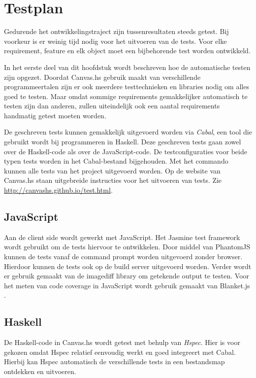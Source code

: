 \chapter{Testplan} \label{hoofdstuk:testplan}
Gedurende het ontwikkelingstraject zijn tussenresultaten steeds getest. Bij voorkeur is er weinig tijd nodig voor het uitvoeren van de tests. Voor elke requirement, feature en elk object moet een bijbehorende test worden ontwikkeld.

In het eerste deel van dit hoofdstuk wordt beschreven hoe de automatische testen zijn opgezet. Doordat Canvas.hs gebruik maakt van verschillende programmeertalen zijn er ook meerdere testtechnieken en libraries nodig om alles goed te testen. Maar omdat sommige requirements gemakkelijker automatisch te testen zijn dan anderen, zullen uiteindelijk ook een aantal requirements handmatig getest moeten worden.

De geschreven tests kunnen gemakkelijk uitgevoerd worden via \emph{Cabal}, een tool die gebruikt wordt bij programmeren in Haskell. Deze geschreven tests gaan zowel over de Haskell-code als over de JavaScript-code. De testconfiguraties voor beide typen tests worden in het Cabal-bestand bijgehouden. Met het commando  kunnen alle tests van het project uitgevoerd worden. Op de website van Canvas.hs staan uitgebreide instructies voor het uitvoeren van tests. Zie \url{http://canvashs.github.io/test.html}.

\section{JavaScript} 
Aan de client side wordt gewerkt met JavaScript. Het Jasmine \cite{Jasmine} test framework wordt gebruikt om de tests hiervoor te ontwikkelen. Door middel van PhantomJS \cite{PhantomJS} kunnen de tests vanaf de command prompt worden uitgevoerd zonder browser. Hierdoor kunnen de tests ook op de build server uitgevoerd worden. Verder wordt er gebruik gemaakt van de imagediff \cite{imagediff} library om getekende output te testen. Voor het meten van code coverage in JavaScript wordt gebruik gemaakt van Blanket.js \cite{Blanket.js}.

\section{Haskell}
De Haskell-code in Canvas.hs wordt getest met behulp van \emph{Hspec}\cite{Hspec}. Hier is voor gekozen omdat Hspec relatief eenvoudig werkt en goed integreert met Cabal. Hierbij kan Hspec automatisch de verschillende tests in een bestandsmap ontdekken en uitvoeren.

